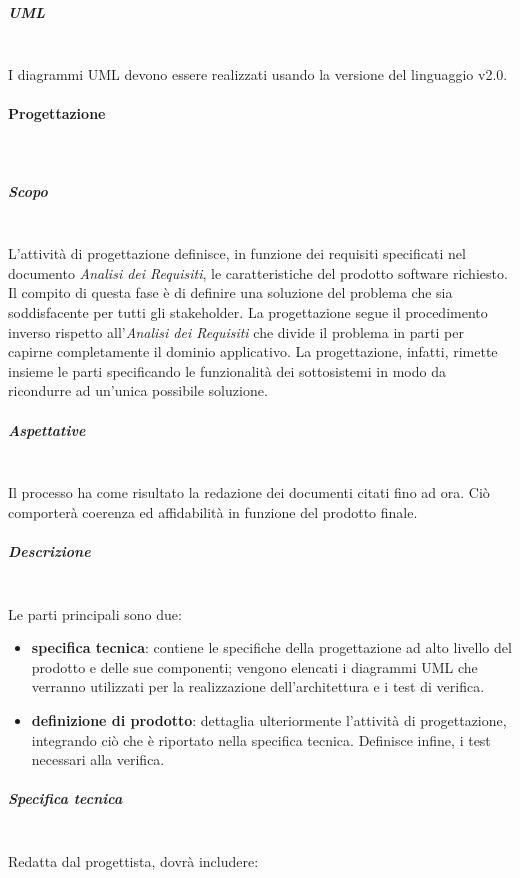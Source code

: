 			\subparagraph{UML} \mbox{}\\
			I diagrammi UML devono essere realizzati usando la versione del linguaggio v2.0.

		\paragraph{Progettazione} \mbox{}\\
			\subparagraph{Scopo} \mbox{}\\
			L'attività di progettazione definisce, in funzione dei requisiti specificati nel documento \textit{Analisi dei Requisiti}, le caratteristiche del prodotto software richiesto. Il compito di questa fase è di definire una soluzione del problema che sia soddisfacente per tutti gli stakeholder. La progettazione segue il procedimento inverso rispetto all'\textit{Analisi dei Requisiti} che divide il problema in parti per capirne completamente il dominio applicativo. La progettazione, infatti, rimette insieme le parti specificando le funzionalità dei sottosistemi in modo da ricondurre ad un'unica possibile soluzione.
			\subparagraph{Aspettative} \mbox{}\\
			Il processo ha come risultato la redazione dei documenti citati fino ad ora. Ciò comporterà
			coerenza ed affidabilità in funzione del prodotto finale.
			\subparagraph{Descrizione} \mbox{}\\
			Le parti principali sono due:
			\begin{itemize}
				\item \textbf{specifica tecnica}: contiene le specifiche della progettazione ad alto livello del prodotto e delle sue componenti; vengono elencati i diagrammi UML che verranno utilizzati per la realizzazione dell'architettura e i test di verifica.
				\item \textbf{definizione di prodotto}: dettaglia ulteriormente l'attività di progettazione, integrando ciò che è riportato nella specifica tecnica. Definisce infine, i test necessari alla verifica.
			\end{itemize}
			\subparagraph{Specifica tecnica} \mbox{}\\
			Redatta dal progettista, dovrà includere:
